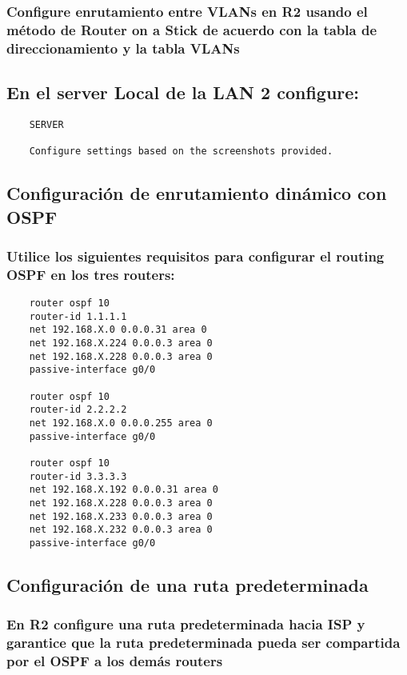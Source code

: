 \documentclass[twocolumn]{article}
\begin{document}
    \subsubsection*{Configure enrutamiento entre VLANs en R2 usando el método de Router on a Stick de acuerdo con la tabla de direccionamiento y la tabla VLANs}
    
    \subsection*{En el server Local de la LAN 2 configure:}
    
    \begin{verbatim}
    SERVER
    
    Configure settings based on the screenshots provided.
    \end{verbatim}
    
    \subsection*{Configuración de enrutamiento dinámico con OSPF}
    
    \subsubsection*{Utilice los siguientes requisitos para configurar el routing OSPF en los tres routers:}
    
    \begin{verbatim}
    router ospf 10
    router-id 1.1.1.1
    net 192.168.X.0 0.0.0.31 area 0
    net 192.168.X.224 0.0.0.3 area 0
    net 192.168.X.228 0.0.0.3 area 0
    passive-interface g0/0
    
    router ospf 10
    router-id 2.2.2.2
    net 192.168.X.0 0.0.0.255 area 0
    passive-interface g0/0
    
    router ospf 10
    router-id 3.3.3.3
    net 192.168.X.192 0.0.0.31 area 0
    net 192.168.X.228 0.0.0.3 area 0
    net 192.168.X.233 0.0.0.3 area 0
    net 192.168.X.232 0.0.0.3 area 0
    passive-interface g0/0
    \end{verbatim}
    
    \subsection*{Configuración de una ruta predeterminada}
    
    \subsubsection*{En R2 configure una ruta predeterminada hacia ISP y garantice que la ruta predeterminada pueda ser compartida por el OSPF a los demás routers}
    
\end{document}

